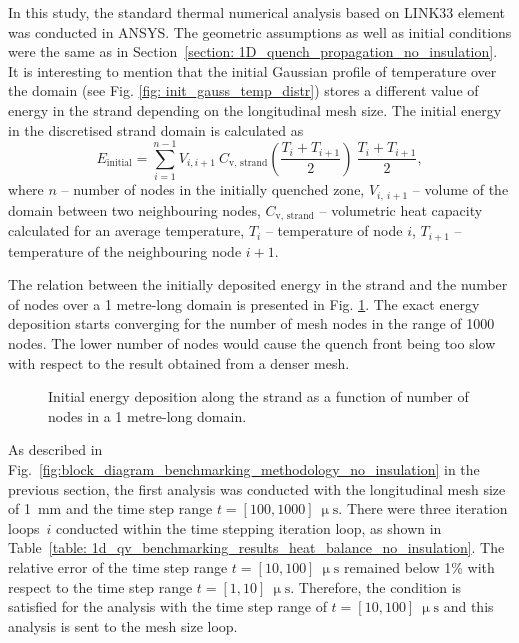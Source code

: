 
In this study, the standard thermal numerical analysis based on LINK33 element was conducted in ANSYS. The geometric assumptions as well as initial conditions were the same as in Section~\ref{section: 1D_quench_propagation_no_insulation}. It is interesting to mention that the initial Gaussian profile of temperature over the domain (see Fig. \ref{fig: init_gauss_temp_distr}) stores a different value of energy in the strand depending on the longitudinal mesh size. The initial energy in the discretised strand domain is calculated as
\begin{equation}
    E_\text{initial} = \sum_{i=1}^{n-1} V_{i,i+1}~C_\text{v, strand}\left(\frac{T_i+T_{i+1}}{2}\right)~\frac{T_i+T_{i+1}}{2},
\end{equation}
where $n$ -- number of nodes in the initially quenched zone, $V_{i,~i+1}$ -- volume of the domain between two neighbouring nodes, $C_\text{v, strand}$ -- volumetric heat capacity calculated for an average temperature, $T_i$ -- temperature of node $i$, $T_{i+1}$ -- temperature of the neighbouring node $i+1$.

The relation between the initially deposited energy in the strand and the number of nodes over a 1 metre-long domain is presented in Fig. \ref{fig: q_vel_modelling_energy_deposition}. The exact energy deposition starts converging for the number of mesh nodes in the range of 1000 nodes. The lower number of nodes would cause the quench front being too slow with respect to the result obtained from a denser mesh.

\begin{figure}[H]
\centering
    \caption{Initial energy deposition along the strand as a function of number of nodes in a 1 metre-long domain.}
    \label{fig: q_vel_modelling_energy_deposition}
\end{figure}

As described in Fig.~\ref{fig:block_diagram_benchmarking_methodology_no_insulation} in the previous section, the first analysis was conducted with the longitudinal mesh size of 1~mm and the time step range $t=[100, 1000]~\upmu \text{s}$. There were three iteration loops~$i$ conducted within the time stepping iteration loop, as shown in Table~\ref{table: 1d_qv_benchmarking_results_heat_balance_no_insulation}. The relative error of the time step range $t=[10, 100]~\upmu \text{s}$ remained below 1\% with respect to the time step range $t= [1, 10]~\upmu \text{s}$. Therefore, the condition is satisfied for the analysis with the time step range of $t=[10, 100]~\upmu \text{s}$ and this analysis is sent to the mesh size loop.

